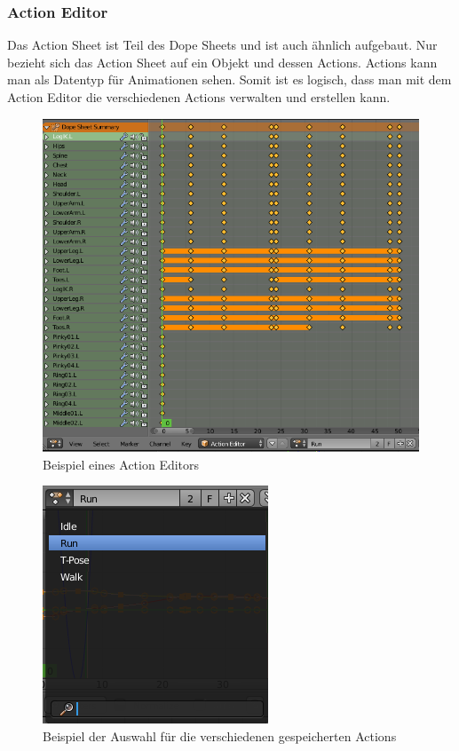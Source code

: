 \subsubsection{Action Editor}
Das Action Sheet ist Teil des Dope Sheets und ist auch ähnlich aufgebaut. Nur bezieht sich das Action Sheet auf ein Objekt und dessen Actions.
Actions kann man als Datentyp für Animationen sehen. Somit ist es logisch, dass man mit dem Action Editor die verschiedenen Actions verwalten und erstellen kann.
\citep{Blender:ActionEditor}
\citep{Blender:Actions}

\begin{figure}[H]
                \centering

                \includegraphics[width=.8\textwidth]{images/animation_action_editor.PNG}
                \caption{Beispiel eines Action Editors}
\end{figure}

\begin{figure}[H]
    \centering

    \includegraphics[width=.8\textwidth]{images/animation_action_editor_actions.PNG}
    \caption{Beispiel der Auswahl für die verschiedenen gespeicherten Actions}
\end{figure}


